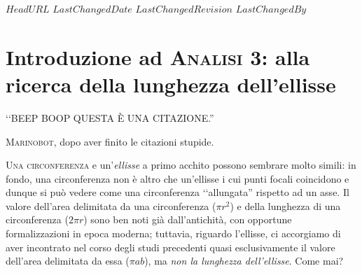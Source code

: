 \svnidlong
{$HeadURL$}
{$LastChangedDate$}
{$LastChangedRevision$}
{$LastChangedBy$}

\chapter{Introduzione ad \textsc{Analisi 3}: alla ricerca della lunghezza dell'ellisse}

\begin{introduction}
‘‘BEEP BOOP QUESTA È UNA CITAZIONE.''
\begin{flushright}
	\textsc{Marinobot,} dopo aver finito le citazioni stupide.
\end{flushright}
\end{introduction}
\lettrine[findent=1pt, nindent=0pt]{U}{na circonferenza} e un'\emph{ellisse} a primo acchito possono sembrare molto simili: in fondo, una circonferenza non è altro che un'ellisse i cui punti focali coincidono e dunque si può vedere come una circonferenza ‘‘allungata'' rispetto ad un asse. Il valore dell'area delimitata da una circonferenza ($\pi r^2$) e della lunghezza di una circonferenza ($2\pi r$) sono ben noti già dall'antichità, con opportune formalizzazioni in epoca moderna; tuttavia, riguardo l'ellisse, ci accorgiamo di aver incontrato nel corso degli studi precedenti quasi esclusivamente il valore dell'area delimitata da essa ($\pi ab$), ma \emph{non la lunghezza dell'ellisse}. Come mai?\\

